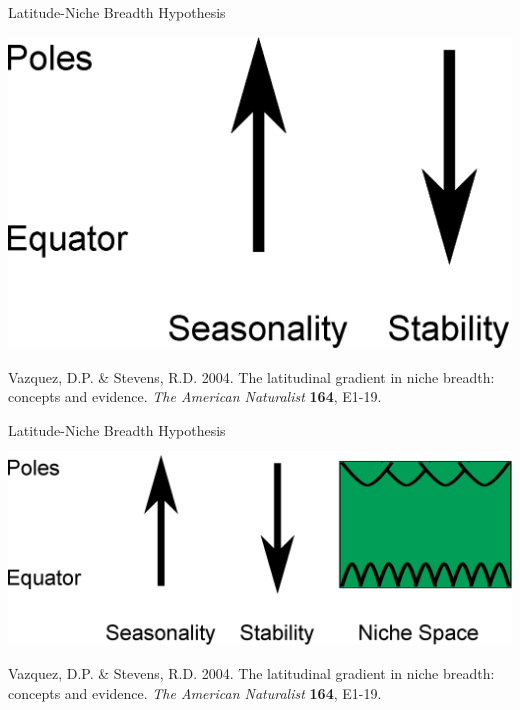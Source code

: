\documentclass{beamer}
\begin{document}
  \begin{frame}{Latitude-Niche Breadth Hypothesis}

    \begin{center}
      \includegraphics[width=.8\textwidth]{Figures/latitude_niche_breadth_2.eps}
    \end{center}

    \footnotesize{Vazquez, D.P. \& Stevens, R.D. 2004. The latitudinal gradient in niche breadth: concepts and evidence. \emph{The American Naturalist} \textbf{164}, E1-19.}
  \end{frame}


  \begin{frame}{Latitude-Niche Breadth Hypothesis}

    \begin{center}
      \includegraphics[width=.8\textwidth]{Figures/latitude_niche_breadth_3.eps}
    \end{center}

    \footnotesize{Vazquez, D.P. \& Stevens, R.D. 2004. The latitudinal gradient in niche breadth: concepts and evidence. \emph{The American Naturalist} \textbf{164}, E1-19.}
  \end{frame}
\end{document}
